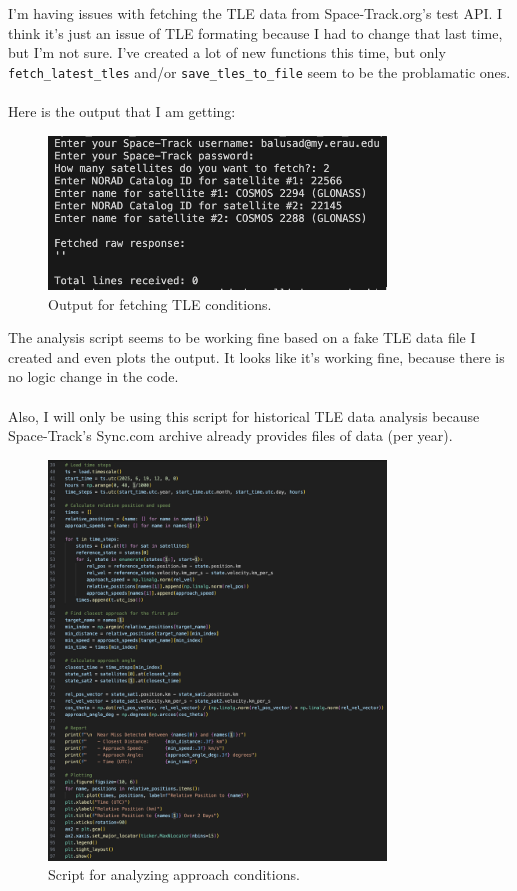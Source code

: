 \documentclass[12pt]{report}
\begin{document}
\begin{enumerate}
    I'm having issues with fetching the TLE data from Space-Track.org's test API. I think it's just an issue of TLE formating because I had to change that last time, but I'm not sure. I've created a lot of new functions this time, but only \texttt{fetch\_latest\_tles} and/or \texttt{save\_tles\_to\_file} seem to be the problamatic ones.
    \\ \\
    Here is the output that I am getting:

    \begin{figure}[H]
      \centering
      \includegraphics[width=0.8\textwidth]{figure_week_7_fetch-output.png}
      \caption{Output for fetching TLE conditions.}
      \label{fig:fetch-tle-data-out}
    \end{figure}

    The analysis script seems to be working fine based on a fake TLE data file I created and even plots the output. It looks like it's working fine, because there is no logic change in the code.
    \\ \\
    Also, I will only be using this script for historical TLE data analysis because Space-Track's Sync.com archive already provides files of data (per year).

    \begin{figure}[H]
      \centering
      \includegraphics[width=0.8\textwidth]{figure_week_6_analyze-approach.png}
      \caption{Script for analyzing approach conditions.}
      \label{fig:analyze-tle-data}
    \end{figure}


\end{enumerate}
\end{document}
